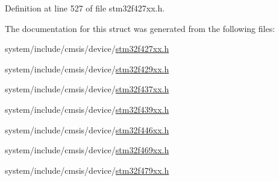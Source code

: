 Definition at line 527 of file stm32f427xx.\+h.



The documentation for this struct was generated from the following files\+:\begin{DoxyCompactItemize}
\item 
system/include/cmsis/device/\hyperlink{stm32f427xx_8h}{stm32f427xx.\+h}\item 
system/include/cmsis/device/\hyperlink{stm32f429xx_8h}{stm32f429xx.\+h}\item 
system/include/cmsis/device/\hyperlink{stm32f437xx_8h}{stm32f437xx.\+h}\item 
system/include/cmsis/device/\hyperlink{stm32f439xx_8h}{stm32f439xx.\+h}\item 
system/include/cmsis/device/\hyperlink{stm32f446xx_8h}{stm32f446xx.\+h}\item 
system/include/cmsis/device/\hyperlink{stm32f469xx_8h}{stm32f469xx.\+h}\item 
system/include/cmsis/device/\hyperlink{stm32f479xx_8h}{stm32f479xx.\+h}\end{DoxyCompactItemize}
